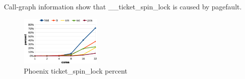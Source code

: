 Call-graph information show that \_\_ticket\_spin\_lock is caused by pagefault.
\begin{figure}[!h!t]  
    \centering
    \includegraphics[width=0.35\textwidth]{eps/phoenix_spinlock.eps}
    \caption{Phoenix ticket\_spin\_lock percent}
    \label{fig:phoenix:spinlock}
\end{figure}





